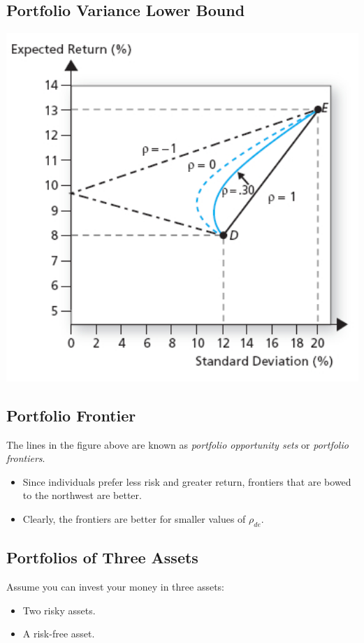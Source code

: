 \documentclass[letterpaper,10pt,english]{sphinxmanual}
\begin{document}
\subsection{Portfolio Variance Lower Bound}
\label{portfolioOpt:id5}
\includegraphics[width=6in]{pg205_1.jpg}


\subsection{Portfolio Frontier}
\label{portfolioOpt:portfolio-frontier}
The lines in the figure above are known as \emph{portfolio opportunity
sets} or \emph{portfolio frontiers}.
\begin{itemize}
\item {} 
Since individuals prefer less risk and greater return, frontiers
that are bowed to the northwest are better.

\end{itemize}
\begin{itemize}
\item {} 
Clearly, the frontiers are better for smaller values of
$\rho_{de}$.

\end{itemize}


\subsection{Portfolios of Three Assets}
\label{portfolioOpt:portfolios-of-three-assets}
Assume you can invest your money in three assets:
\begin{itemize}
\item {} 
Two risky assets.

\end{itemize}
\begin{itemize}
\item {} 
A risk-free asset.

\end{itemize}
\end{document}
